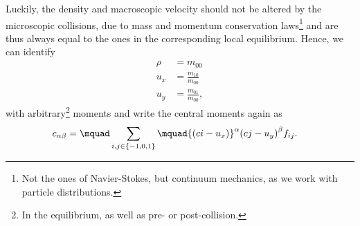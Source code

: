 Luckily, the density and macroscopic velocity should not be altered by the microscopic collisions, due to mass and momentum conservation laws\footnote{Not the ones of Navier-Stokes, but continuum mechanics, as we work with particle distributions.} and are thus always equal to the ones in the corresponding local equilibrium.
Hence, we can identify
\begin{align}
  \rho & = m_{00}
  \label{eq: density definition}\\
  u_x  & = \frac{m_{10}}{m_{00}}
  \label{eq: x velocity definition}\\
  u_y  & = \frac{m_{01}}{m_{00}},
  \label{eq: y velocity definition}
\end{align}
with arbitrary\footnote{In the equilibrium, as well as pre- or post-collision.} moments and write the central moments again as
\begin{align}
  c_{\alpha\beta} &= \mquad\sum_{i,j \in \{-1,0,1\}}\mquad
  {\left(ci - u_x\right)}^\alpha
  {\left(cj - u_y\right)}^\beta f_{ij}.
  \label{eq: central moment definition velocities}
\end{align}

